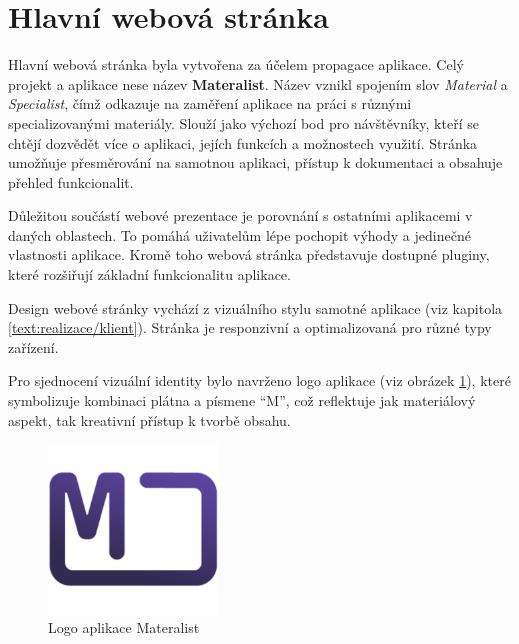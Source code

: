 

\section{Hlavní webová stránka}\label{text:realizace/hlavniStranka}

Hlavní webová stránka byla vytvořena za účelem propagace aplikace.
Celý projekt a aplikace nese název \textbf{Materalist}.
Název vznikl spojením slov \textit{Material} a \textit{Specialist}, čímž odkazuje na zaměření aplikace na práci s různými specializovanými materiály.
Slouží jako výchozí bod pro návštěvníky, kteří se chtějí dozvědět více o aplikaci, jejích funkcích a možnostech využití. 
Stránka umožňuje přesměrování na samotnou aplikaci, přístup k dokumentaci a obsahuje přehled funkcionalit.

Důležitou součástí webové prezentace je porovnání s ostatními aplikacemi v daných oblastech. 
To pomáhá uživatelům lépe pochopit výhody a jedinečné vlastnosti aplikace. 
Kromě toho webová stránka představuje dostupné pluginy, které rozšiřují základní funkcionalitu aplikace.

Design webové stránky vychází z vizuálního stylu samotné aplikace (viz kapitola \ref{text:realizace/klient}). 
Stránka je responzivní a optimalizovaná pro různé typy zařízení.

Pro sjednocení vizuální identity bylo navrženo logo aplikace (viz obrázek \ref{fig:logo}), které symbolizuje kombinaci plátna a písmene \enquote{M}, což reflektuje jak materiálový aspekt, tak kreativní přístup k tvorbě obsahu.

\begin{figure}[ht!]
    \centering
    \includegraphics[width=0.4\textwidth]{media/05_realizace/logo.png}
    \caption{Logo aplikace Materalist}
    \label{fig:logo}
\end{figure}

